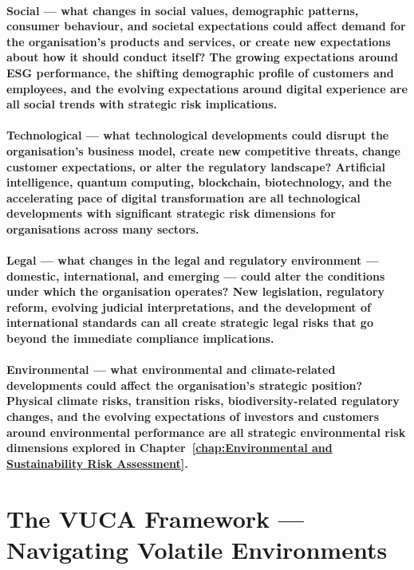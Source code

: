 \paragraph{\textbf{Social} — what changes in social values, demographic patterns, consumer behaviour, and societal expectations could affect demand for the organisation's products and services, or create new expectations about how it should conduct itself? The growing expectations around ESG performance, the shifting demographic profile of customers and employees, and the evolving expectations around digital experience are all social trends with strategic risk implications.}
\paragraph{\textbf{Technological} — what technological developments could disrupt the organisation's business model, create new competitive threats, change customer expectations, or alter the regulatory landscape? Artificial intelligence, quantum computing, blockchain, biotechnology, and the accelerating pace of digital transformation are all technological developments with significant strategic risk dimensions for organisations across many sectors.}
\paragraph{\textbf{Legal} — what changes in the legal and regulatory environment — domestic, international, and emerging — could alter the conditions under which the organisation operates? New legislation, regulatory reform, evolving judicial interpretations, and the development of international standards can all create strategic legal risks that go beyond the immediate compliance implications.}
\paragraph{\textbf{Environmental} — what environmental and climate-related developments could affect the organisation's strategic position? Physical climate risks, transition risks, biodiversity-related regulatory changes, and the evolving expectations of investors and customers around environmental performance are all strategic environmental risk dimensions explored in Chapter~\ref{chap:Environmental and Sustainability Risk Assessment}.}

\section{The VUCA Framework — Navigating Volatile Environments}

